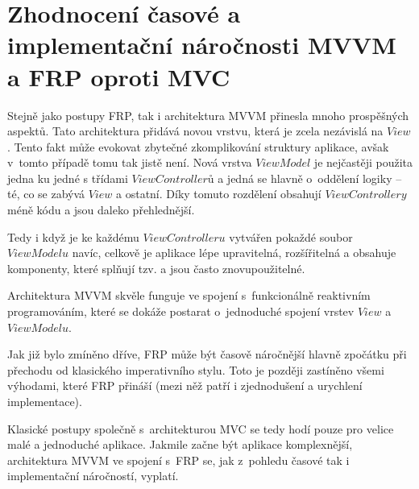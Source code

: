 \documentclass[thesis=M,czech]{FITthesis}[2012/06/26]
\begin{document}
\section{Zhodnocení časové a implementační náročnosti MVVM a FRP oproti MVC}
Stejně jako postupy FRP, tak i architektura MVVM přinesla mnoho prospěšných aspektů. Tato architektura přidává novou vrstvu, která je zcela nezávislá na $View$. Tento fakt může evokovat zbytečné zkomplikování struktury aplikace, avšak v~tomto případě tomu tak jistě není. Nová vrstva $ViewModel$ je nejčastěji použita jedna ku jedné s třídami $ViewControllerů$ a jedná se hlavně o~oddělení logiky -- té, co se zabývá $View$ a ostatní. Díky tomuto rozdělení obsahují $ViewControllery$ méně kódu a jsou daleko přehlednější.

Tedy i když je ke každému $ViewControlleru$ vytvářen pokaždé soubor $ViewModelu$ navíc, celkově je aplikace lépe upravitelná, rozšířitelná a obsahuje komponenty, které splňují tzv.  a jsou často znovupoužitelné.

Architektura MVVM skvěle funguje ve spojení s~funkcionálně reaktivním programováním, které se dokáže postarat o~jednoduché spojení vrstev $View$ a $ViewModelu$.

Jak již bylo zmíněno dříve, FRP může být časově náročnější hlavně zpočátku při přechodu od klasického imperativního stylu. Toto je později zastíněno všemi výhodami, které FRP přináší (mezi něž patří i zjednodušení a urychlení implementace).

Klasické postupy společně s~architekturou MVC se tedy hodí pouze pro velice malé a jednoduché aplikace. Jakmile začne být aplikace komplexnější, architektura MVVM ve spojení s~FRP se, jak z~pohledu časové tak i implementační náročností, vyplatí.
\end{document}
